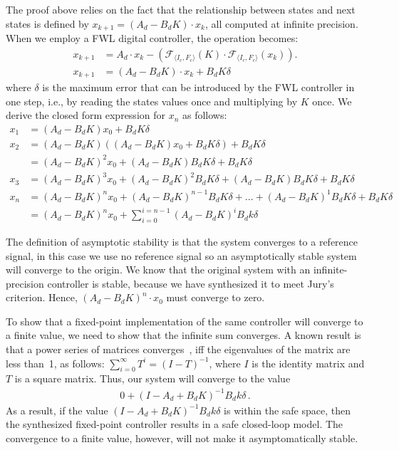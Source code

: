 \documentclass[runningheads,a4paper]{llncs}
\begin{document}
The proof above relies on the fact that the relationship between states and
next states is defined by $x_{k+1} = (A_d - B_dK) \cdot x_k$, all computed
at infinite precision.  When we employ a FWL digital controller, the
operation becomes:
%
\begin{align*}
x_{k+1} &= A_d \cdot x_{k} -(\mathcal{F}_{\langle I_c,F_c \rangle}(K)\cdot\mathcal{F}_{\langle I_c,F_c \rangle}(x_{k})).  \\
x_{k+1} &= (A_d  - B_dK) \cdot x_k + B_dK\delta
\end{align*}
%
where $\delta$ is the maximum error that can be introduced by the FWL
controller in one step, i.e., by reading the states values once and
multiplying by $K$ once.  We derive the closed form expression for $x_n$ as
follows:
%
\begin{align*}
x_{1} &= (A_d  - B_dK)x_0 + B_dK\delta \\
x_{2} &= (A_d  - B_dK)((A_d  - B_dK)x_0 + B_dK\delta ) + B_dK\delta \\
      &=(A_d  - B_dK)^2x_0 + (A_d  - B_dK)B_dK\delta + B_dK\delta \\
x_{3}  &=(A_d  - B_dK)^3x_0 + (A_d  - B_dK)^2B_dK\delta + (A_d  - B_dK)B_dK\delta + B_dK\delta\\
x_{n} &= (A_d  - B_dK)^nx_0 + (A_d  - B_dK)^{n-1}B_dK\delta + ... + (A_d  - B_dK)^1B_dK \delta + B_dK\delta \\
  &= (A_d - B_dK)^nx_0 + \sum_{i=0}^{i=n-1}(A_d - B_dK)^iB_dk\delta
\end{align*}

The definition of asymptotic stability is that the system converges to a
reference signal, in this case we use no reference signal so an
asymptotically stable system will converge to the origin.  We know that the
original system with an infinite-precision controller is stable, because we
have synthesized it to meet Jury's criterion.  Hence, $(A_d - B_dK)^n \cdot
x_0$ must converge to zero.

To show that a fixed-point implementation of the same controller will
converge to a finite value, we need to show that the infinite sum converges. 
A known result is that a power series of matrices
converges~\cite{horn1990matrix}, iff the eigenvalues of the matrix are less
than~1, as follows:
%
$\sum_{i=0}^{\infty}T^i  = (I - T)^{-1}$, 
%
where $I$ is the identity matrix and $T$ is a square matrix. Thus, our system will converge to the value 
%
\begin{align*}
0 + (I - A_d + B_dK)^{-1}B_dk\delta \,. 
\end{align*}
%
As a result, if the value $(I - A_d + B_dK)^{-1}B_dk\delta$ is within the
safe space, then the synthesized fixed-point controller results in a safe
closed-loop model.  The convergence to a finite value, however, will not
make it asymptomatically stable.
\end{document}
